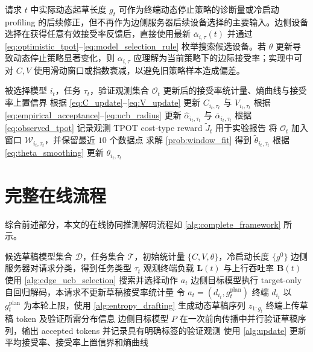 \documentclass[11pt,a4paper]{ctexart}
\begin{document}
请求 $t$ 中实际动态起草长度 $g_t$ 可作为终端动态停止策略的诊断量或冷启动 profiling 的后续修正，但不再作为边侧服务器后续设备选择的主要输入。边侧设备选择在获得任意有效接受率反馈后，直接使用最新 $\overline{\alpha}_{i,\tau}(t)$ 并通过 \cref{eq:optimistic_tpot}--\cref{eq:model_selection_rule} 枚举搜索候选设备。若 $\theta$ 更新导致动态停止策略显著变化，则 $\alpha_{i,\tau}$ 应理解为当前策略下的边际接受率；实现中可对 $C,V$ 使用滑动窗口或指数衰减，以避免旧策略样本造成偏差。

\begin{algorithm}[t]
\caption{请求结束后的反馈更新}
\label{alg:update}
\begin{algorithmic}[1]
\Require 被选择模型 $i_t$，任务 $\tau_t$，验证观测集合 $\mathcal{O}_t$
\Ensure 更新后的接受率统计量、熵曲线与接受率上置信界
\State 根据 \cref{eq:C_update}--\cref{eq:V_update} 更新 $C_{i_t,\tau_t}$ 与 $V_{i_t,\tau_t}$
\State 根据 \cref{eq:empirical_acceptance}--\cref{eq:ucb_radius} 更新 $\widehat{\alpha}_{i_t,\tau_t}$ 与 $\overline{\alpha}_{i_t,\tau_t}$
\State 根据 \cref{eq:observed_tpot} 记录观测 TPOT cost-type reward $\widetilde{J}_t$ 用于实验报告
\State 将 $\mathcal{O}_t$ 加入窗口 $\mathcal{W}_{i_t,\tau_t}$，并保留最近 $10$ 个数据点
    \State 求解 \cref{prob:window_fit} 得到 $\widetilde{\theta}_{i_t,\tau_t}$
    \State 根据 \cref{eq:theta_smoothing} 更新 $\theta_{i_t,\tau_t}$
\EndIf
\end{algorithmic}
\end{algorithm}

\section{完整在线流程}
\label{sec:complete_algorithm}

综合前述部分，本文的在线协同推测解码流程如 \cref{alg:complete_framework} 所示。

\begin{algorithm}[t]
\caption{边缘-终端协同推测解码的两层在线学习框架}
\label{alg:complete_framework}
\begin{algorithmic}[1]
\Require 候选草稿模型集合 $\mathcal{D}$，任务集合 $\mathcal{T}$，初始统计量 $\{C,V,\theta\}$，冷启动长度 $\{g^0\}$
    \State 边侧服务器对请求分类，得到任务类型 $\tau_t$
    \State 观测终端负载 $\mathbf{L}(t)$ 与上行吞吐率 $\mathbf{B}(t)$
    \State 使用 \cref{alg:edge_ucb_selection} 搜索并选择动作 $a_t$
        \State 边侧目标模型执行 target-only 自回归解码，本请求不更新草稿接受率统计量
    \Else
        \State 令 $a_t=(d_{i_t},g_t^{\mathrm{plan}})$
            \State 终端 $d_{i_t}$ 以 $g_t^{\mathrm{plan}}$ 为本轮上限，使用 \cref{alg:entropy_drafting} 生成动态草稿序列 $z_{1:g_t}$
            \State 终端上传草稿 token 及验证所需分布信息
            \State 边侧目标模型 $P$ 在一次前向传播中并行验证草稿序列，输出 accepted tokens 并记录具有明确标签的验证观测
        \EndWhile
        \State 使用 \cref{alg:update} 更新平均接受率、接受率上置信界和熵曲线
    \EndIf
\EndFor
\end{algorithmic}
\end{algorithm}
\end{document}
